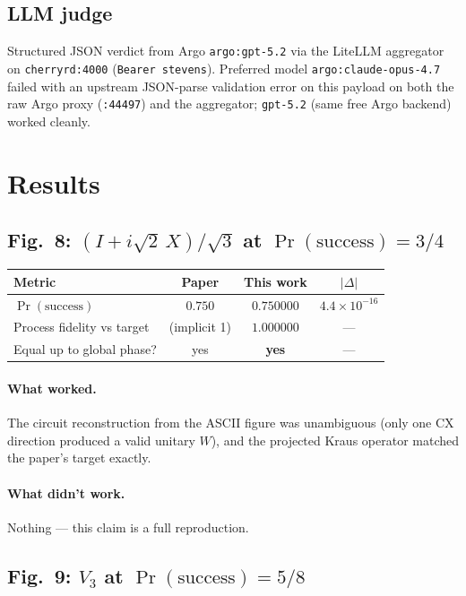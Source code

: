 \documentclass[11pt,a4paper]{article}
\newcommand{\Vthree}{V_{\!3}}
\newcommand{\Prsucc}{\Pr(\text{success})}
\begin{document}
\subsection{LLM judge}
Structured JSON verdict from Argo \texttt{argo:gpt-5.2} via the LiteLLM
aggregator on \texttt{cherryrd:4000} (\texttt{Bearer stevens}).  Preferred
model \texttt{argo:claude-opus-4.7} failed with an upstream JSON-parse
validation error on this payload on both the raw Argo proxy (\texttt{:44497})
and the aggregator; \texttt{gpt-5.2} (same free Argo backend) worked cleanly.

\section{Results}

\subsection{Fig.~8: $(I + i\sqrt{2}\,X)/\sqrt{3}$ at $\Prsucc = 3/4$}

\begin{center}
\begin{tabular}{l c c c}
\toprule
 Metric & Paper & This work & $\lvert\Delta\rvert$ \\
\midrule
 $\Prsucc$ & $0.750$ & $0.750000$ & $4.4\times 10^{-16}$ \\
 Process fidelity vs target & (implicit 1) & $1.000000$ & --- \\
 Equal up to global phase? & yes & \textbf{yes} & --- \\
\bottomrule
\end{tabular}
\end{center}

\paragraph{What worked.} The circuit reconstruction from the ASCII figure was
unambiguous (only one CX direction produced a valid unitary $W$), and the
projected Kraus operator matched the paper's target exactly.

\paragraph{What didn't work.} Nothing --- this claim is a full reproduction.

\subsection{Fig.~9: $\Vthree$ at $\Prsucc = 5/8$}
\end{document}
